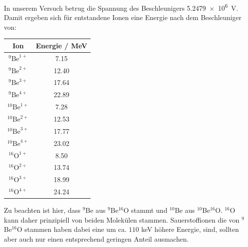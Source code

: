 In unserem Versuch betrug die Spannung des Beschleunigers \SI{5.2479e6}{\volt}.
Damit ergeben sich für entstandene Ionen eine Energie nach dem Beschleuniger von:
\begin{center}
  \begin{tabular}{|c|c|}
    \hline
    Ion & Energie / \si{\mega\electronvolt} \\
    \hline
    $^{9}\text{Be}^{1+}$ & \num{7.15} \\
    $^{9}\text{Be}^{2+}$ & \num{12.40} \\
    $^{9}\text{Be}^{3+}$ & \num{17.64} \\
    $^{9}\text{Be}^{4+}$ & \num{22.89} \\
    \hline
    $^{10}\text{Be}^{1+}$ & \num{7.28} \\
    $^{10}\text{Be}^{2+}$ & \num{12.53} \\
    $^{10}\text{Be}^{3+}$ & \num{17.77} \\
    $^{10}\text{Be}^{4+}$ & \num{23.02} \\
    \hline
    $^{16}\text{O}^{1+}$ & \num{8.50} \\
    $^{16}\text{O}^{2+}$ & \num{13.74} \\
    $^{16}\text{O}^{3+}$ & \num{18.99} \\
    $^{16}\text{O}^{4+}$ & \num{24.24} \\
    \hline
  \end{tabular}
  \label{Auswertung_tab_Ionenenergien_nach_Besch}
\end{center}

Zu beachten ist hier, dass $^9$Be aus $^{9}$Be$^{16}$O stammt und $^{10}$Be aus $^{10}$Be$^{16}$O.
$^{16}$O kann daher prinzipiell von beiden Molekülen stammen.
Sauerstoffionen die von $^{9}$Be$^{16}$O stammen haben dabei eine um ca. $110$ keV höhere Energie, sind, sollten aber auch nur einen entsprechend geringen Anteil ausmachen.

